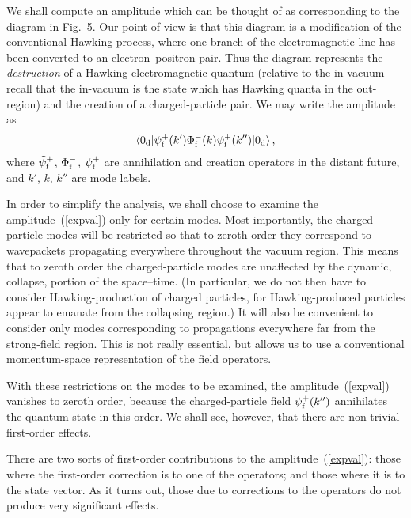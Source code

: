 \documentclass[11pt]{article}
\begin{document}
We shall compute an amplitude which can be thought of as corresponding to the
diagram in Fig.~5.  Our point of view is that this diagram is a modification of
the conventional Hawking process, where one branch of the electromagnetic line
has been converted to an electron--positron pair.  Thus the diagram represents
the {\em destruction} of a Hawking electromagnetic quantum (relative to the
in-vacuum --- recall that the in-vacuum is the state which has Hawking quanta
in the out-region) and the creation of a charged-particle pair.  We may write
the amplitude as
\begin{equation}\label{expval}
\langle 0_{\rm d}|{\tilde\psi}^+_{\rm f}(k')\Phi
^-_{\rm f}(k)\psi ^+_{\rm f}(k'')|0_{\rm d}\rangle\, ,
\end{equation}
where ${\tilde\psi}^+_{\rm f}$, $\Phi ^-_{\rm f}$, $\psi ^+_{\rm f}$ are
annihilation  and creation operators in the distant future, and $k'$, $k$,
$k''$ are mode labels.  

In order to simplify the analysis, we shall choose to examine the
amplitude~(\ref{expval}) only for certain modes.   Most importantly, the
charged-particle modes will be restricted so that to zeroth order they
correspond to wavepackets propagating everywhere throughout the vacuum region. 
This means that to zeroth order the charged-particle modes are unaffected by
the dynamic, collapse, portion of the space--time. (In particular, we do not
then have to consider Hawking-production of charged particles, for
Hawking-produced particles appear to emanate from the collapsing region.) It
will also be convenient to consider only modes corresponding to propagations
everywhere far from the strong-field region.  This is not really essential, but
allows us to use a conventional momentum-space representation of the field
operators.

With these restrictions on the modes to be examined,  the
amplitude~(\ref{expval})  vanishes to zeroth order, because the
charged-particle field $\psi ^+_{\rm f}(k'')$ annihilates the quantum state in
this order.  We shall see, however, that there are non-trivial first-order
effects.

There are two sorts of first-order contributions to the 
amplitude~(\ref{expval}):   those where the first-order correction is to one of
the operators; and those where it is to the state vector.  As it turns out,
those due to corrections to the operators do not produce very significant
effects.  
\end{document}
